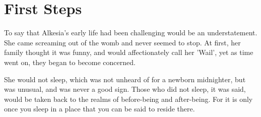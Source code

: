 

\chapter{First Steps}

To say that Alkesia's early life had been challenging would be an understatement.
She came screaming out of the womb and never seemed to stop. 
At first, her family thought it was funny, and would affectionately call her 'Wail', yet as time went on, they began to become concerned.

She would not sleep, which was not unheard of for a newborn midnighter, but was unusual, and was never a good sign. 
Those who did not sleep, it was said, would be taken back to the realms of before-being and after-being. 
For it is only once you sleep in a place that you can be said to reside there.

%

